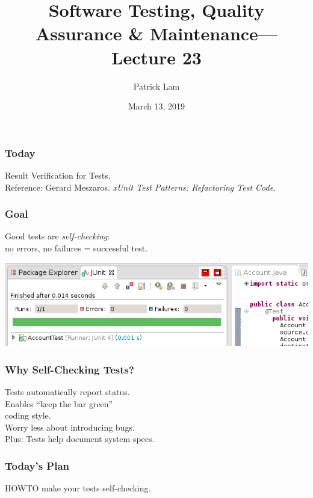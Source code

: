 \documentclass{beamer}
\title{Software Testing, Quality Assurance \& Maintenance---Lecture 23}
\author{Patrick Lam}
\date{March 13, 2019}
\newenvironment{changemargin}[1]{%
  \begin{list}{}{%
    \setlength{\topsep}{0pt}%
    \setlength{\leftmargin}{#1}%
    \setlength{\rightmargin}{1em}
    \setlength{\listparindent}{\parindent}%
    \setlength{\itemindent}{\parindent}%
    \setlength{\parsep}{\parskip}%
  }%
  \item[]}{\end{list}}
\begin{document}
\begin{frame}
  \titlepage
\end{frame}

\begin{frame}
\frametitle{Today}
\begin{changemargin}{2cm}
  Result Verification for Tests.\\[2em]
  Reference: Gerard Meszaros. \emph{xUnit Test Patterns: Refactoring Test Code}.
\end{changemargin}
\end{frame}

\begin{frame}
  \frametitle{Goal}

  \Large
  \begin{changemargin}{2cm}
    Good tests are \emph{self-checking}:\\[1em]
    no errors, no failures = successful test.
  \end{changemargin}

  \begin{center}
    \includegraphics[width=.6\textwidth]{L23/pass}
  \end{center}
  
\end{frame}

\begin{frame}
  \frametitle{Why Self-Checking Tests?}

  \Large
  \begin{changemargin}{2cm}
    Tests automatically report status.\\[1em]
    Enables ``keep the bar green''\\
    coding style.\\[1em]
    Worry less about introducing bugs.\\[1em]
    Plus: Tests help document system specs.
  \end{changemargin}
\end{frame}

\begin{frame}
  \frametitle{Today's Plan}

  \Large
  \begin{changemargin}{1cm}
    HOWTO make your tests self-checking.
  \end{changemargin}
\end{frame}
\end{document}
